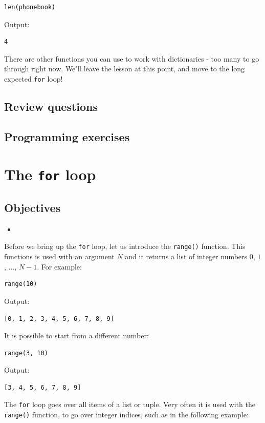 \begin{verbatim}
len(phonebook)
\end{verbatim}
Output:

\begin{verbatim}
4
\end{verbatim}
There are other functions you can use to work with dictionaries - too many to go 
through right now. We'll leave the lesson at this point, and move to the long 
expected {\tt for} loop!

\subsection{Review questions}

\subsection{Programming exercises}


\section{The {\tt for} loop} \label{sec:forloop}

\subsection{Objectives}

\begin{itemize}
\item
\end{itemize}

Before we bring up the {\tt for} loop, let us introduce the {\tt range()}
function. This functions is used with an argument $N$ and it returns 
a list of integer numbers $0$, $1$, $\ldots$, $N-1$. For example:

\begin{verbatim}
range(10)
\end{verbatim}
Output:

\begin{verbatim}
[0, 1, 2, 3, 4, 5, 6, 7, 8, 9]
\end{verbatim}
It is possible to start from a different number:

\begin{verbatim}
range(3, 10)
\end{verbatim}
Output:

\begin{verbatim}
[3, 4, 5, 6, 7, 8, 9]
\end{verbatim}
The {\tt for} loop goes over all items of a list or tuple.
Very often it is used with the {\tt range()} function, to go over 
integer indices, such as in the following example:

